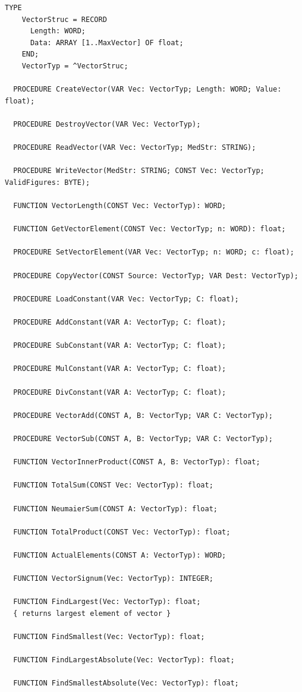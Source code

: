 \begin{refsection}
\begin{lstlisting}[caption=Interface of unit Vector]
  TYPE
    VectorStruc = RECORD
      Length: WORD;
      Data: ARRAY [1..MaxVector] OF float;
    END;
    VectorTyp = ^VectorStruc;

  PROCEDURE CreateVector(VAR Vec: VectorTyp; Length: WORD; Value: float);

  PROCEDURE DestroyVector(VAR Vec: VectorTyp);

  PROCEDURE ReadVector(VAR Vec: VectorTyp; MedStr: STRING);

  PROCEDURE WriteVector(MedStr: STRING; CONST Vec: VectorTyp; ValidFigures: BYTE);

  FUNCTION VectorLength(CONST Vec: VectorTyp): WORD;

  FUNCTION GetVectorElement(CONST Vec: VectorTyp; n: WORD): float;

  PROCEDURE SetVectorElement(VAR Vec: VectorTyp; n: WORD; c: float);

  PROCEDURE CopyVector(CONST Source: VectorTyp; VAR Dest: VectorTyp);

  PROCEDURE LoadConstant(VAR Vec: VectorTyp; C: float);

  PROCEDURE AddConstant(VAR A: VectorTyp; C: float);

  PROCEDURE SubConstant(VAR A: VectorTyp; C: float);

  PROCEDURE MulConstant(VAR A: VectorTyp; C: float);

  PROCEDURE DivConstant(VAR A: VectorTyp; C: float);

  PROCEDURE VectorAdd(CONST A, B: VectorTyp; VAR C: VectorTyp);

  PROCEDURE VectorSub(CONST A, B: VectorTyp; VAR C: VectorTyp);

  FUNCTION VectorInnerProduct(CONST A, B: VectorTyp): float;

  FUNCTION TotalSum(CONST Vec: VectorTyp): float;

  FUNCTION NeumaierSum(CONST A: VectorTyp): float;

  FUNCTION TotalProduct(CONST Vec: VectorTyp): float;

  FUNCTION ActualElements(CONST A: VectorTyp): WORD;

  FUNCTION VectorSignum(Vec: VectorTyp): INTEGER;

  FUNCTION FindLargest(Vec: VectorTyp): float;
  { returns largest element of vector }

  FUNCTION FindSmallest(Vec: VectorTyp): float;

  FUNCTION FindLargestAbsolute(Vec: VectorTyp): float;

  FUNCTION FindSmallestAbsolute(Vec: VectorTyp): float;


\end{lstlisting}
\end{refsection}
